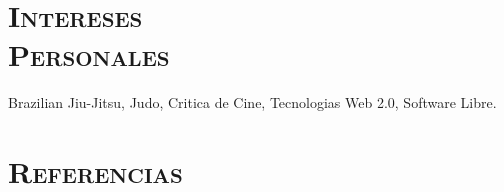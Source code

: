 \begin{resume}




\section{\textsc{Intereses\\ Personales}}
\employer{}
\title{}
\location{} 
\dates{}
Brazilian Jiu-Jitsu, Judo, Critica de Cine, Tecnologias Web 2.0, Software Libre.
\section{\textsc{Referencias}}


\end{resume}

